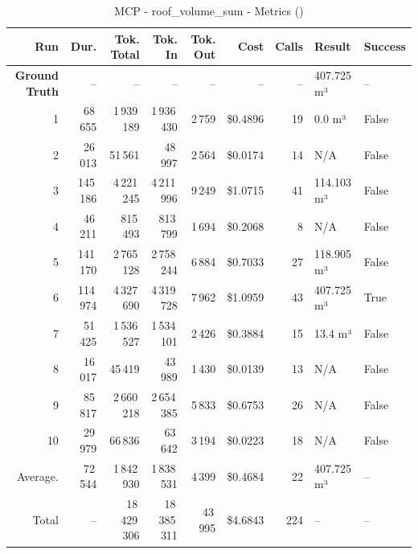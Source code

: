 \documentclass[a4paper,11pt]{article}
\begin{document}
\begin{table}[ht]
\centering
\scriptsize
\caption{MCP - roof\_volume\_sum - Metrics ()}
\label{tab:mcp\_roof\_volume\_sum\_metrics\_}
\begin{tabular}{r r r r r r r p{3cm} l}
\hline
Run & Dur. & Tok. Total & Tok. In & Tok. Out & Cost & Calls & Result & Success \\
\hline
\textbf{Ground Truth} & -- & -- & -- & -- & -- & -- & 407.725 m³ & -- \\
\hline
1 & 68\,655 & 1\,939\,189 & 1\,936\,430 & 2\,759 & \$0.4896 & 19 & 0.0 m³ & False \\
2 & 26\,013 & 51\,561 & 48\,997 & 2\,564 & \$0.0174 & 14 & N/A & False \\
3 & 145\,186 & 4\,221\,245 & 4\,211\,996 & 9\,249 & \$1.0715 & 41 & 114.103 m³ & False \\
4 & 46\,211 & 815\,493 & 813\,799 & 1\,694 & \$0.2068 & 8 & N/A & False \\
5 & 141\,170 & 2\,765\,128 & 2\,758\,244 & 6\,884 & \$0.7033 & 27 & 118.905 m³ & False \\
6 & 114\,974 & 4\,327\,690 & 4\,319\,728 & 7\,962 & \$1.0959 & 43 & 407.725 m³ & True \\
7 & 51\,425 & 1\,536\,527 & 1\,534\,101 & 2\,426 & \$0.3884 & 15 & 13.4 m³ & False \\
8 & 16\,017 & 45\,419 & 43\,989 & 1\,430 & \$0.0139 & 13 & N/A & False \\
9 & 85\,817 & 2\,660\,218 & 2\,654\,385 & 5\,833 & \$0.6753 & 26 & N/A & False \\
10 & 29\,979 & 66\,836 & 63\,642 & 3\,194 & \$0.0223 & 18 & N/A & False \\
\hline
Average. & 72\,544 & 1\,842\,930 & 1\,838\,531 & 4\,399 & \$0.4684 & 22 & 407.725 m³ & -- \\
Total & -- & 18\,429\,306 & 18\,385\,311 & 43\,995 & \$4.6843 & 224 & -- & -- \\
\hline
\end{tabular}
\end{table}

\clearpage
\end{document}
